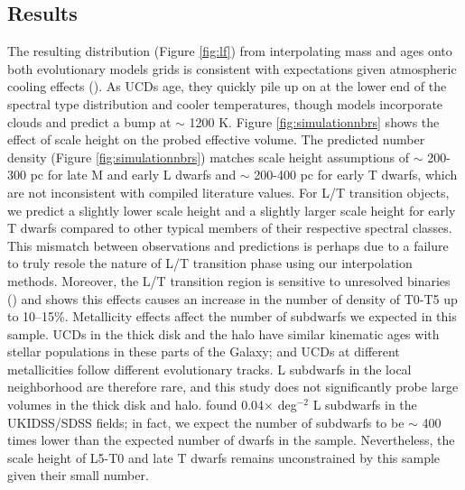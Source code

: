 \documentclass[manuscript]{aastex63}
\begin{document}
\subsection{Results}
The resulting \teff distribution (Figure \ref{fig:lf}) from interpolating mass and ages onto both evolutionary models grids is consistent with expectations given atmospheric cooling effects (\citealt{2004ApJS..155..191B}). As UCDs age, they quickly pile up on at the lower end of the spectral type distribution and cooler temperatures, though \cite{2008ApJ...689.1327S} models incorporate clouds and predict a bump at \teff $\sim$ 1200 K. Figure \ref{fig:simulationnbrs} shows the effect of scale height on the probed effective volume. The predicted number density (Figure \ref{fig:simulationnbrs}) matches scale height assumptions of $\sim$ 200-300 pc for late M and early L dwarfs and $\sim$ 200-400 pc for early T dwarfs, which are not inconsistent with compiled literature values. For L/T transition objects, we predict a slightly lower scale height and a slightly larger scale height for early T dwarfs compared to other typical members of their respective spectral classes. This mismatch between observations and predictions is perhaps due to a failure to truly resole the nature of L/T transition phase using our interpolation methods. Moreover, the L/T transition region is sensitive to unresolved binaries (\citealt{2014ApJ...794..143B}) and \cite{2007ApJ...659..655B} shows this effects causes an increase in the number of density of T0-T5 up to 10--15\%. Metallicity effects affect the number of subdwarfs we expected in this sample. UCDs in the thick disk and the halo have similar kinematic ages with stellar populations in these parts of the Galaxy; and UCDs at different metallicities follow different evolutionary tracks. L subdwarfs in the local neighborhood are therefore rare, and this study does not significantly probe large volumes in the thick disk and halo. \cite{Lodieu2017} found 0.04$\times$ deg$^{-2}$ L subdwarfs in the UKIDSS/SDSS fields; in fact, we expect the number of subdwarfs to be $\sim$ 400 times lower than the expected number of dwarfs in the sample. Nevertheless, the scale height of L5-T0 and late T dwarfs remains unconstrained by this sample given their small number. 
\end{document}

